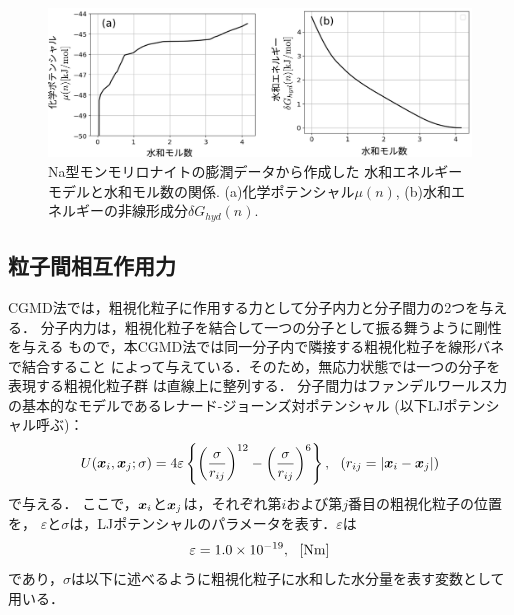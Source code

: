 \begin{figure}[h]
	\begin{center}
	\includegraphics[width=1.0\linewidth]{Figs/fig2.pdf} 
	\end{center}
	\caption{
		Na型モンモリロナイトの膨潤データから作成した
		水和エネルギーモデルと水和モル数の関係.
		(a)化学ポテンシャル$\mu(n)$, (b)水和エネルギーの非線形成分$\delta G_{hyd}(n)$.
	} 
	\label{fig:fig2}
\end{figure}
\subsection{粒子間相互作用力}
CGMD法では，粗視化粒子に作用する力として分子内力と分子間力の2つを与える．
分子内力は，粗視化粒子を結合して一つの分子として振る舞うように剛性を与える
もので，本CGMD法では同一分子内で隣接する粗視化粒子を線形バネで結合すること
によって与えている．そのため，無応力状態では一つの分子を表現する粗視化粒子群
は直線上に整列する．
分子間力はファンデルワールス力の基本的なモデルであるレナード-ジョーンズ対ポテンシャル
(以下LJポテンシャル呼ぶ)：
\begin{equation}
	U(\mbox{\boldmath $x$}_i,\mbox{\boldmath $x$}_j; \sigma) 
	= 4 \varepsilon 
	\left\{ 
	\left(\frac{\sigma}{r_{ij}}\right)^{12}
	-
	\left(\frac{\sigma}{r_{ij}}\right)^6
	\right\}, \ \ \left( r_{ij}=\left| \mbox{\boldmath $x$}_i-\mbox{\boldmath $x$}_j\right| \right)
	\label{eqn:LJ}
\end{equation}
で与える．
ここで，$\mbox{\boldmath $x$}_i$と$\mbox{\boldmath $x$}_j$は，それぞれ第$i$および第$j$番目の粗視化粒子の位置を，
$\varepsilon$と$\sigma$は，LJポテンシャルのパラメータを表す．$\varepsilon$は
\begin{equation}
	\varepsilon=1.0\times 10^{-19}, \ \ [{\rm Nm}]
	\label{eqn:eps_of_LJ}
\end{equation}
であり，$\sigma$は以下に述べるように粗視化粒子に水和した水分量を表す変数として用いる．

